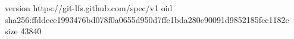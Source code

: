 version https://git-lfs.github.com/spec/v1
oid sha256:ffddece1993476bd078f0a0655d950d7ffe1bda280e90091d9852185fcc1182e
size 43840
